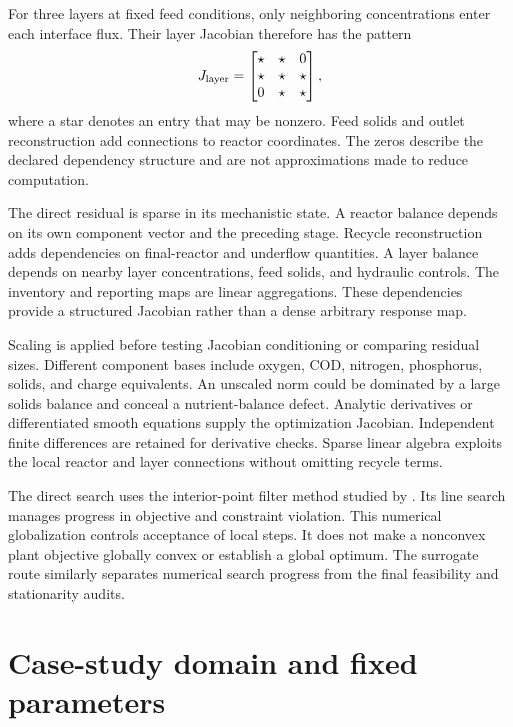 For three layers at fixed feed conditions, only neighboring concentrations enter each interface flux. Their layer Jacobian therefore has the pattern
\begin{equation}
J_{\rm layer}=\begin{bmatrix}\star&\star&0\\\star&\star&\star\\0&\star&\star\end{bmatrix},
\end{equation}
where a star denotes an entry that may be nonzero. Feed solids and outlet reconstruction add connections to reactor coordinates. The zeros describe the declared dependency structure and are not approximations made to reduce computation.

The direct residual is sparse in its mechanistic state. A reactor balance depends on its own component vector and the preceding stage. Recycle reconstruction adds dependencies on final-reactor and underflow quantities. A layer balance depends on nearby layer concentrations, feed solids, and hydraulic controls. The inventory and reporting maps are linear aggregations. These dependencies provide a structured Jacobian rather than a dense arbitrary response map.

Scaling is applied before testing Jacobian conditioning or comparing residual sizes. Different component bases include oxygen, COD, nitrogen, phosphorus, solids, and charge equivalents. An unscaled norm could be dominated by a large solids balance and conceal a nutrient-balance defect. Analytic derivatives or differentiated smooth equations supply the optimization Jacobian. Independent finite differences are retained for derivative checks. Sparse linear algebra exploits the local reactor and layer connections without omitting recycle terms.

The direct search uses the interior-point filter method studied by \citet{WachterBiegler2006}. Its line search manages progress in objective and constraint violation. This numerical globalization controls acceptance of local steps. It does not make a nonconvex plant objective globally convex or establish a global optimum. The surrogate route similarly separates numerical search progress from the final feasibility and stationarity audits.

\section{Case-study domain and fixed parameters}

